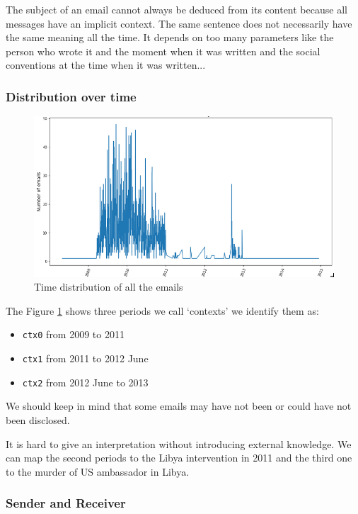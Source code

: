 \documentclass[11pt]{article}
\begin{document}
The subject of an email cannot always be deduced from its content because all messages have an implicit context. The same sentence does not necessarily have the same meaning all the time. It depends on too many parameters like the person who wrote it and the moment when it was written and the social conventions at the time when it was written...

\subsubsection{Distribution over time}

\begin{figure}[h]
	\centering
	\includegraphics[width=\linewidth]{images/emails_distribution.png}
	\caption{Time distribution of all the emails}
	\label{fig:emails_time_distribution}
\end{figure}

The Figure \ref{fig:emails_time_distribution} shows three periods we call `contexts' we identify them as:

\begin{itemize}
    \item \texttt{ctx0} from 2009 to 2011
    \item \texttt{ctx1} from 2011 to 2012 June
    \item \texttt{ctx2} from 2012 June to 2013
\end{itemize}

We should keep in mind that some emails may have not been or could have not been disclosed.

It is hard to give an interpretation without introducing external knowledge. We can map the second periods to the Libya intervention in 2011 and the third one to the murder of US ambassador in Libya.

\subsubsection{Sender and Receiver}
\end{document}
